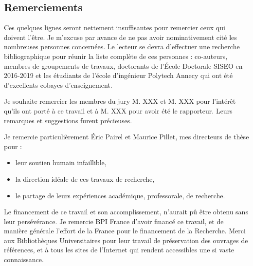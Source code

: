 {}

\chead[\fancyplain{}{}]
{\fancyplain{}{}}
\lfoot[\fancyplain{}{}]
{\fancyplain{}{}}
\cfoot[\fancyplain{}{\thepage}]
{\fancyplain{}{\thepage}}
\rfoot[\fancyplain{}{}]%
{\fancyplain{}{\scriptsize}}

\vspace*{-1cm}
\begin{flushright}
	\section*{\fontsize{20pt}{20pt}\selectfont\textnormal{Remerciements}}
\end{flushright}

Ces quelques lignes seront nettement insuffisantes pour remercier ceux qui doivent l'être.
Je m'excuse par avance de ne pas avoir nominativement cité les nombreuses personnes concernées.
Le lecteur se devra d'effectuer une recherche bibliographique pour réunir la liste complète de ces personnes : co-auteurs, membres de groupements de travaux, doctorants de l'École Doctorale SISEO en 2016-2019 et les étudiants de l'école d'ingénieur Polytech Annecy qui ont été d'excellents cobayes d'enseignement.

\bigskip
\noindent
Je souhaite remercier les membres du jury M. XXX et M. XXX pour l'intérêt qu'ils ont porté à ce travail et à M. XXX pour avoir été le rapporteur.
Leurs remarques et suggestions furent précieuses.

\bigskip
\noindent
Je remercie particulièrement Éric Pairel et Maurice Pillet, mes directeurs de thèse pour :
\begin{itemize}
\item leur soutien humain infaillible,
\item la direction idéale de ces travaux de recherche,
\item le partage de leurs expériences académique, professorale, de recherche.
\end{itemize}
Le financement de ce travail et son accomplissement, n'aurait pû être obtenu sans leur persévérance.
\noindent
Je remercie BPI France d'avoir financé ce travail, et de manière générale l'effort de la France pour le financement de la Recherche.
Merci aux Bibliothèques Universitaires pour leur travail de préservation des ouvrages de références, et à tous les sites de l'Internet qui rendent accessibles une si vaste connaissance.

